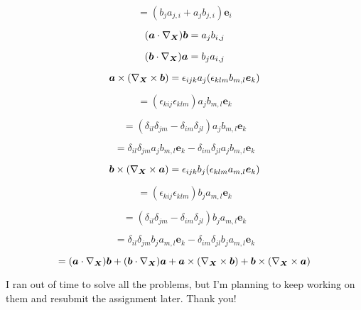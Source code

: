 \documentclass[preprint,12pt,authoryear]{elsarticle}
\begin{document}
\begin{equation*}
    = (b_j a_{j,i} + a_j b_{j,i}) \bm{e}_i
\end{equation*}

\bigskip

\begin{equation*}
    (\bm{a} \cdot \nabla_{\bm{X}}) \bm{b} = a_j b_{i,j}
\end{equation*}

\begin{equation*}
    (\bm{b} \cdot \nabla_{\bm{X}}) \bm{a} = b_j a_{i,j}
\end{equation*}

\begin{equation*}
    \bm{a} \times (\nabla_{\bm{X}} \times \bm{b}) = \epsilon_{ijk} a_j (\epsilon_{klm} b_{m,l} \bm{e}_k)
\end{equation*}

\begin{equation*}
    = (\epsilon_{kij} \epsilon_{klm}) a_j b_{m,l} \bm{e}_k
\end{equation*}

\begin{equation*}
    = (\delta_{il} \delta_{jm} - \delta_{im} \delta_{jl}) a_j b_{m,l} \bm{e}_k
\end{equation*}

\begin{equation*}
    = \delta_{il} \delta_{jm} a_j b_{m,l} \bm{e}_k - \delta_{im} \delta_{jl} a_j b_{m,l} \bm{e}_k
\end{equation*}

\begin{equation*}
    \bm{b} \times (\nabla_{\bm{X}} \times \bm{a}) = \epsilon_{ijk} b_j (\epsilon_{klm} a_{m,l} \bm{e}_k)
\end{equation*}

\begin{equation*}
    = (\epsilon_{kij} \epsilon_{klm}) b_j a_{m,l} \bm{e}_k
\end{equation*}

\begin{equation*}
    = (\delta_{il} \delta_{jm} - \delta_{im} \delta_{jl}) b_j a_{m,l} \bm{e}_k
\end{equation*}

\begin{equation*}
    = \delta_{il} \delta_{jm} b_j a_{m,l} \bm{e}_k - \delta_{im} \delta_{jl} b_j a_{m,l} \bm{e}_k
\end{equation*}




\begin{equation*}
    = (\bm{a} \cdot \nabla_{\bm{X}}) \bm{b} + (\bm{b} \cdot \nabla_{\bm{X}}) \bm{a} + \bm{a} \times (\nabla_{\bm{X}} \times \bm{b}) + \bm{b} \times (\nabla_{\bm{X}} \times \bm{a})
\end{equation*}

I ran out of time to solve all the problems, but I'm planning to keep working on them and resubmit the assignment later. Thank you!
\end{document}
